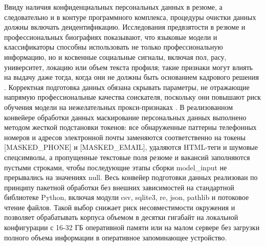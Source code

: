 Ввиду наличия конфиденциальных персональных данных в резюме, а следовательно и в контуре программного комплекса, процедуры очистки данных должны включать деидентификацию. Исследования предвзятости в резюме и профессиональных биографиях показывают, что языковые модели и классификаторы способны использовать не только профессиональную информацию, но и косвенные социальные сигналы, включая пол, расу, университет, локацию или объем текста профиля; такие признаки могут влиять на выдачу даже тогда, когда они не должны быть основанием кадрового решения \cite{src22, src34, src35}. Корректная подготовка данных обязана скрывать параметры, не отражающие напрямую профессиональные качества соискателя, поскольку они повышают риск обучения модели на нежелательных прокси-признаках \cite{src02, src22}. В реализованном конвейере обработки данных маскирование персональных данных выполнено методом жесткой подстановки токенов: все обнаруженные паттерны телефонных номеров и адресов электронной почты заменяются соответственно на токены [MASKED\_PHONE] и [MASKED\_EMAIL], удаляются HTML-теги и шумовые спецсимволы, а пропущенные текстовые поля резюме и вакансий заполняются пустыми строками, чтобы последующие этапы сборки model\_input не прерывались на значениях null. Весь конвейер подготовки данных реализован по принципу пакетной обработки без внешних зависимостей на стандартной библиотеке Python, включая модули csv, sqlite3, re, json, pathlib и потоковое чтение файлов. Такой выбор снижает риск несовместимости окружения и позволяет обрабатывать корпуса объемом в десятки гигабайт на локальной конфигурации с 16-32 ГБ оперативной памяти или на малом сервере без загрузки полного объема информации в оперативное запоминающее устройство.\par
